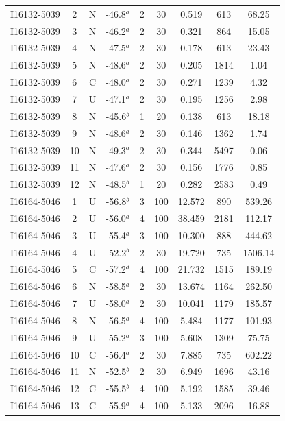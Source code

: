 \begin{table}
\begin{tabular}{ccccccccc}
I16132-5039 & 2 & N & -46.8$^{a}$ & 2 & 30 & 0.519 & 613 & 68.25 \\
I16132-5039 & 3 & N & -46.2$^{a}$ & 2 & 30 & 0.321 & 864 & 15.05 \\
I16132-5039 & 4 & N & -47.5$^{a}$ & 2 & 30 & 0.178 & 613 & 23.43 \\
I16132-5039 & 5 & N & -48.6$^{a}$ & 2 & 30 & 0.205 & 1814 & 1.04 \\
I16132-5039 & 6 & C & -48.0$^{a}$ & 2 & 30 & 0.271 & 1239 & 4.32 \\
I16132-5039 & 7 & U & -47.1$^{a}$ & 2 & 30 & 0.195 & 1256 & 2.98 \\
I16132-5039 & 8 & N & -45.6$^{b}$ & 1 & 20 & 0.138 & 613 & 18.18 \\
I16132-5039 & 9 & N & -48.6$^{a}$ & 2 & 30 & 0.146 & 1362 & 1.74 \\
I16132-5039 & 10 & N & -49.3$^{a}$ & 2 & 30 & 0.344 & 5497 & 0.06 \\
I16132-5039 & 11 & N & -47.6$^{a}$ & 2 & 30 & 0.156 & 1776 & 0.85 \\
I16132-5039 & 12 & N & -48.5$^{b}$ & 1 & 20 & 0.282 & 2583 & 0.49 \\
I16164-5046 & 1 & U & -56.8$^{b}$ & 3 & 100 & 12.572 & 890 & 539.26 \\
I16164-5046 & 2 & U & -56.0$^{a}$ & 4 & 100 & 38.459 & 2181 & 112.17 \\
I16164-5046 & 3 & U & -55.4$^{a}$ & 3 & 100 & 10.300 & 888 & 444.62 \\
I16164-5046 & 4 & U & -52.2$^{b}$ & 2 & 30 & 19.720 & 735 & 1506.14 \\
I16164-5046 & 5 & C & -57.2$^{d}$ & 4 & 100 & 21.732 & 1515 & 189.19 \\
I16164-5046 & 6 & N & -58.5$^{a}$ & 2 & 30 & 13.674 & 1164 & 262.50 \\
I16164-5046 & 7 & U & -58.0$^{a}$ & 2 & 30 & 10.041 & 1179 & 185.57 \\
I16164-5046 & 8 & N & -56.5$^{a}$ & 4 & 100 & 5.484 & 1177 & 101.93 \\
I16164-5046 & 9 & U & -55.2$^{a}$ & 3 & 100 & 5.608 & 1309 & 75.75 \\
I16164-5046 & 10 & C & -56.4$^{a}$ & 2 & 30 & 7.885 & 735 & 602.22 \\
I16164-5046 & 11 & N & -52.5$^{b}$ & 2 & 30 & 6.949 & 1696 & 43.16 \\
I16164-5046 & 12 & C & -55.5$^{b}$ & 4 & 100 & 5.192 & 1585 & 39.46 \\
I16164-5046 & 13 & C & -55.9$^{a}$ & 4 & 100 & 5.133 & 2096 & 16.88 \\

\end{tabular}
\end{table}
